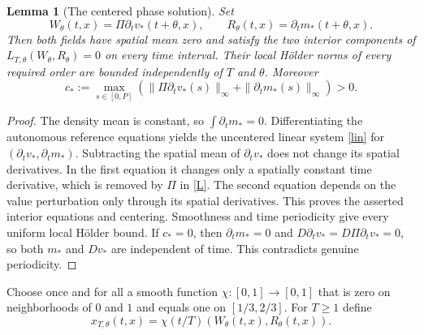\documentclass[11pt]{article}
\newtheorem{lemma}[theorem]{Lemma}
\begin{document}
\begin{lemma}[The centered phase solution]\label{phasefield}
Set
\[
 W_\theta(t,x)=\Pi\partial_t v_*(t+\theta,x),\qquad
 R_\theta(t,x)=\partial_t m_*(t+\theta,x).
\]
Then both fields have spatial mean zero and satisfy the two interior
components of $L_{T,\theta}(W_\theta,R_\theta)=0$ on every time interval.
Their local H\"older norms of every required order are bounded
independently of $T$ and $\theta$. Moreover
\[
 c_*:=\max_{s\in[0,P]}
  \left(\|\Pi\partial_t v_*(s)\|_\infty
                        +\|\partial_t m_*(s)\|_\infty\right)>0.
\]
\end{lemma}
\begin{proof}
The density mean is constant, so $\int\partial_t m_*=0$.
Differentiating the autonomous reference equations yields the
uncentered linear system \eqref{lin} for
$(\partial_t v_*,\partial_t m_*)$.
Subtracting the spatial mean of $\partial_t v_*$ does not change its
spatial derivatives. In the first equation it changes only a spatially
constant time derivative, which is removed by $\Pi$ in \eqref{L}.
The second equation depends on the value perturbation only through its
spatial derivatives. This proves the asserted interior equations and
centering. Smoothness and time periodicity give every uniform local
H\"older bound. If $c_*=0$, then $\partial_t m_*=0$ and
$D\partial_t v_*=D\Pi\partial_t v_*=0$, so both $m_*$ and $Dv_*$
are independent of time. This contradicts genuine periodicity.
\end{proof}

Choose once and for all a smooth function $\chi:[0,1]\to[0,1]$ that
is zero on neighborhoods of $0$ and $1$ and equals one on
$[1/3,2/3]$. For $T\geq1$ define
\[
 x_{T,\theta}(t,x)=\chi(t/T)
                     (W_\theta(t,x),R_\theta(t,x)).
\]
\end{document}
